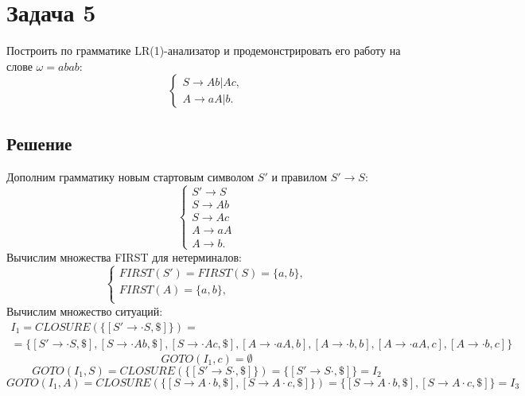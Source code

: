 \documentclass[11pt]{article}
\begin{document}
\section{Задача 5}
\label{sec:orgc70028f}
Построить по грамматике LR(1)-анализатор и продемонстрировать его работу на слове \(\omega = abab\):
\begin{equation}
\begin{cases}
S \rightarrow Ab | Ac, \\
A \rightarrow aA | b.
\end{cases}
\end{equation}
\subsection{Решение}
\label{sec:org18d8e6a}
Дополним грамматику новым стартовым символом \(S'\) и правилом \(S' \rightarrow S\):
\begin{equation}
\begin{cases}
S' \rightarrow S \\
S \rightarrow Ab \\
S \rightarrow Ac \\
A \rightarrow aA \\
A \rightarrow b.
\end{cases}
\end{equation}
Вычислим множества FIRST для нетерминалов:
\begin{equation}
\begin{cases}
FIRST(S') = FIRST(S) = \{a, b\}, \\
FIRST(A) = \{a, b\}, \\
\end{cases}
\end{equation}
Вычислим множество ситуаций:
\begin{multline*}
I_1 = CLOSURE(\{[S' \rightarrow \cdot S, \$]\}) = \\
= \{[S' \rightarrow \cdot S, \$],
[S \rightarrow \cdot Ab, \$], [S \rightarrow \cdot Ac, \$], [A \rightarrow \cdot aA, b],
[A \rightarrow \cdot b, b], [A \rightarrow \cdot aA, c], [A \rightarrow \cdot b, c]\}
\end{multline*}
\begin{equation*}
GOTO(I_1, c) = \emptyset
\end{equation*}
\begin{equation*}
GOTO(I_1, S) = CLOSURE(\{[S' \rightarrow S\cdot, \$]\}) = \{[S'\rightarrow S\cdot, \$]\} = I_2
\end{equation*}
\begin{equation*}
GOTO(I_1, A) = CLOSURE(\{[S \rightarrow A\cdot b, \$], [S \rightarrow A\cdot c, \$]\}) =
\{[S \rightarrow A\cdot b, \$], [S \rightarrow A\cdot c, \$]\} = I_3
\end{equation*}
\end{document}
